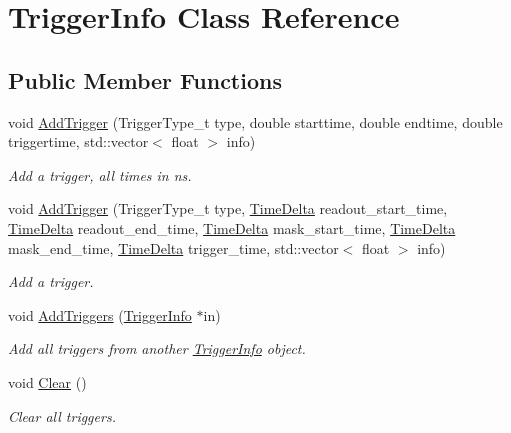 \hypertarget{classTriggerInfo}{\section{Trigger\-Info Class Reference}
\label{classTriggerInfo}
}
\subsection*{Public Member Functions}
\begin{DoxyCompactItemize}
\item 
\hypertarget{classTriggerInfo_a29808bd2956d4561fa6e5f77bb23ab60}{void \hyperlink{classTriggerInfo_a29808bd2956d4561fa6e5f77bb23ab60}{Add\-Trigger} (Trigger\-Type\-\_\-t type, double starttime, double endtime, double triggertime, std\-::vector$<$ float $>$ info)}\label{classTriggerInfo_a29808bd2956d4561fa6e5f77bb23ab60}

\begin{DoxyCompactList}\small\item\em Add a trigger, all times in ns. \end{DoxyCompactList}\item 
\hypertarget{classTriggerInfo_a7df314e7d8cead52a2b9cf8b2d21c383}{void \hyperlink{classTriggerInfo_a7df314e7d8cead52a2b9cf8b2d21c383}{Add\-Trigger} (Trigger\-Type\-\_\-t type, \hyperlink{classTimeDelta}{Time\-Delta} readout\-\_\-start\-\_\-time, \hyperlink{classTimeDelta}{Time\-Delta} readout\-\_\-end\-\_\-time, \hyperlink{classTimeDelta}{Time\-Delta} mask\-\_\-start\-\_\-time, \hyperlink{classTimeDelta}{Time\-Delta} mask\-\_\-end\-\_\-time, \hyperlink{classTimeDelta}{Time\-Delta} trigger\-\_\-time, std\-::vector$<$ float $>$ info)}\label{classTriggerInfo_a7df314e7d8cead52a2b9cf8b2d21c383}

\begin{DoxyCompactList}\small\item\em Add a trigger. \end{DoxyCompactList}\item 
\hypertarget{classTriggerInfo_ad86bd4bc2abff60889b1b3e18a01002c}{void \hyperlink{classTriggerInfo_ad86bd4bc2abff60889b1b3e18a01002c}{Add\-Triggers} (\hyperlink{classTriggerInfo}{Trigger\-Info} $\ast$in)}\label{classTriggerInfo_ad86bd4bc2abff60889b1b3e18a01002c}

\begin{DoxyCompactList}\small\item\em Add all triggers from another \hyperlink{classTriggerInfo}{Trigger\-Info} object. \end{DoxyCompactList}\item 
\hypertarget{classTriggerInfo_a2e1db8250d38d31dc335828ce2f3bf18}{void \hyperlink{classTriggerInfo_a2e1db8250d38d31dc335828ce2f3bf18}{Clear} ()}\label{classTriggerInfo_a2e1db8250d38d31dc335828ce2f3bf18}

\begin{DoxyCompactList}\small\item\em Clear all triggers. \end{DoxyCompactList}\end{DoxyCompactItemize}
